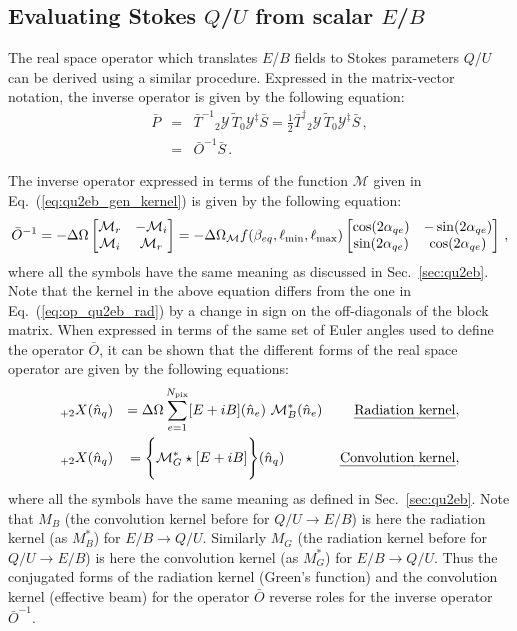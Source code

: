 \documentclass[a4paper,11pt]{article}
\newcommand{\beq}{\begin{equation}}
\newcommand{\eeq}{\end{equation}}
\newcommand{\beqry}{\begin{eqnarray}}
\newcommand{\eeqry}{\end{eqnarray}}
\newcommand{\bmat}{\begin{bmatrix}}
\newcommand{\emat}{\end{bmatrix}}
\newcommand{\mm}{\mathcal{M}}
\def\eq#1{{Eq.~(\ref{#1})}}
\def\sec#1{{Sec.~\ref{#1}}}
\begin{document}
\subsection{Evaluating Stokes $Q$/$U$ from scalar $E$/$B$}\label{sec:eb2qu}
The real space operator which translates $E$/$B$ fields to Stokes parameters $Q$/$U$ can be derived using a similar procedure. Expressed in the matrix-vector notation, the inverse operator is given by the following equation:
%
\begin{subequations}
\beqry
\bar{P} &=& \bar{T}^{-1} {{}_2\mathcal{Y}}\, \tilde T {{}_0\mathcal{Y}^{\ddagger}}\bar{S} = \frac{1}{2} \bar{T}^{\dagger} {{}_2\mathcal{Y}} \,\tilde T {{}_0\mathcal{Y}^{\ddagger}}\bar{S}\,,  \\
&=&  \bar O^{-1} \bar{S}\,.
\eeqry
\end{subequations}
%

The inverse operator expressed in terms of the function $\mm$ given in \eq{eq:qu2eb_gen_kernel} is given by the following equation:
%
\beq
{\bar O}^{-1}=- \Delta \Omega\bmat \mathcal{M}_{r} & -\mathcal{M}_{i} \\  \mathcal{M}_{i}  & \mathcal{M}_{r} \emat=- \Delta \Omega{{}_{\mm}f}(\beta_{eq},\ell_{\rm min},\ell_{\rm max})\bmat \cos(2 \alpha_{qe}) & -\sin(2\alpha_{qe})\\  \sin(2 \alpha_{qe})  & \cos(2 \alpha_{qe}) \emat \,,
\eeq
%
where all the symbols have the same meaning as discussed in \sec{sec:qu2eb}. Note that the kernel in the above equation differs from the one in \eq{eq:op_qu2eb_rad} by a change in sign on the off-diagonals of the block matrix. When expressed in terms of the same set of Euler angles used to define the operator $\bar{O}$, it can be shown that the different forms of the real space operator are given by the following equations:
%
\beqry
    {}_{+2}X(\hat{n}_q) &&=  \Delta \Omega \sum_{e=1}^{N_{\rm pix}} [E+iB](\hat{n}_{e})\   \mathcal{M}^*_{B}(\hat{n}_e) \hspace{0.8cm}\textrm{\emph{Radiation kernel}},\label{eq:eb2qu_radiation} \\
    {}_{+2}X(\hat{n}_q) &&= \Bigg\lbrace \mathcal{M}^*_{G} \star [E+iB] \Bigg\rbrace(\hat{n}_q) \hspace{1.4cm}\textrm{\emph {Convolution kernel}}, \label{eq:eb2qu_convolution}
\eeqry
%
where all the symbols have the same meaning as defined in \sec{sec:qu2eb}. Note that $M_B$ (the convolution kernel before for $Q/U \rightarrow E/B$) is here the radiation kernel (as $M_B^*$) for $E/B \rightarrow Q/U$.  Similarly $M_G$ (the radiation kernel before for $Q/U \rightarrow E/B$) is here the convolution kernel (as $M_G^*$) for $E/B \rightarrow Q/U$.
Thus the conjugated forms of the radiation kernel (Green's function) and the convolution kernel (effective beam) for the operator $\bar{O}$ reverse roles for the inverse operator $\bar{O}^{-1}$.
\end{document}
